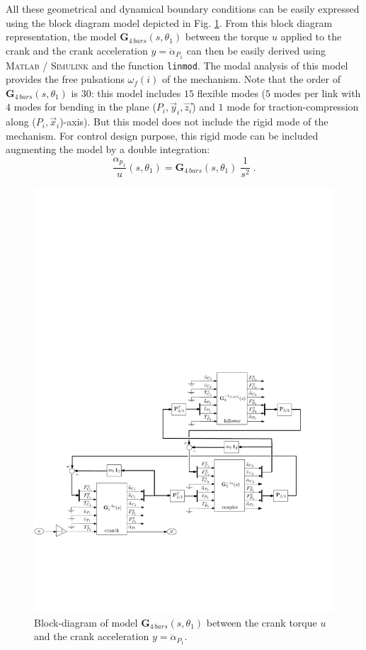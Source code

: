 \documentclass[smallcondensed]{svjour3}     %
\newcommand{\matlab}{\textsc{Matlab }}
\newcommand{\simulink}{\textsc{Simulink }}
\begin{document}
All these geometrical and dynamical boundary conditions can be easily expressed using the block diagram model depicted in Fig. \ref{fig:4bsch}. From this block diagram representation, the model  $\mathbf{G}_{4\,bars}(s,\theta_1)$ between the torque $u$ applied to the crank and the crank acceleration $y=\ddot{\alpha}_{P_1}$ can then be easily derived using \matlab/ \simulink and the function \verb|linmod|. The modal analysis of this model provides the free pulsations $\omega_f(i)$ of the mechanism. Note that the order of $\mathbf{G}_{4\,bars}(s,\theta_1)$ is $30$: this model includes $15$ flexible modes ($5$ modes per link with $4$ modes for bending in the plane ($P_i,\vec{y}_i,\vec{z_i}$) and $1$ mode for traction-compression along ($P_i,\vec{x}_i$)-axis). But this model does not include the rigid mode  of the mechanism. For control design purpose, this rigid mode can be included augmenting the model by a double integration:
\[
\frac{\alpha_{p_1}}{u}(s,\theta_1)=\mathbf{G}_{4\,bars}(s,\theta_1)\;\frac{1}{s^2}\;.
\]

\begin{figure}[htbp!]
  \includegraphics[width=1\textwidth]{fbschemab}
\caption{Block-diagram of model $\mathbf{G}_{4\,bars}(s,\theta_1)$ between the crank torque $u$ and the crank acceleration $y=\ddot{\alpha}_{P_1}$.}
\label{fig:4bsch} 
\end{figure}
\end{document}
